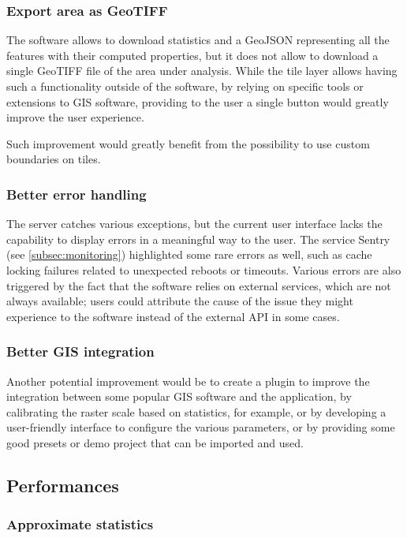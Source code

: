 \documentclass{Configuration_Files/PoliMi3i_thesis}
\begin{document}
\subsubsection{Export area as GeoTIFF}

The software allows to download statistics and a GeoJSON representing all the features with their computed properties, but it does not allow to download a single GeoTIFF file of the area under analysis. While the tile layer allows having such a functionality outside of the software, by relying on specific tools or extensions to GIS software, providing to the user a single button would greatly improve the user experience. 

Such improvement would greatly benefit from the possibility to use custom boundaries on tiles.

\subsubsection{Better error handling}

The server catches various exceptions, but the current user interface lacks the capability to display errors in a meaningful way to the user. The service Sentry (see \ref{subsec:monitoring}) highlighted some rare errors as well, such as cache locking failures related to unexpected reboots or timeouts. Various errors are also triggered by the fact that the software relies on external services, which are not always available; users could attribute the cause of the issue they might experience to the software instead of the external API in some cases.

\subsubsection{Better GIS integration}

Another potential improvement would be to create a plugin to improve the integration between some popular GIS software and the application, by calibrating the raster scale based on statistics, for example, or by developing a user-friendly interface to configure the various parameters, or by providing some good presets or demo project that can be imported and used.

\subsection{Performances}

\subsubsection{Approximate statistics}
\end{document}
